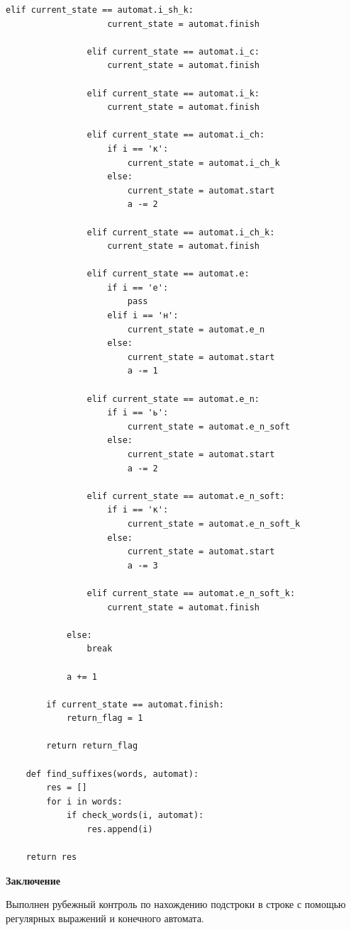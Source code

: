 \documentclass[a4paper,12pt]{report}
\begin{document}
\begin{lstlisting}[frame = single, breaklines, label = list:automat_func, caption = Листинг функций\, работающих с автоматом]
	            elif current_state == automat.i_sh_k:
	                current_state = automat.finish
	
	            elif current_state == automat.i_c:
	                current_state = automat.finish
	
	            elif current_state == automat.i_k:
	                current_state = automat.finish
	
	            elif current_state == automat.i_ch:
	                if i == 'к':
	                    current_state = automat.i_ch_k
	                else:
	                    current_state = automat.start
	                    a -= 2
	
	            elif current_state == automat.i_ch_k:
	                current_state = automat.finish
	
	            elif current_state == automat.e:
	                if i == 'е':
	                    pass
	                elif i == 'н':
	                    current_state = automat.e_n
	                else:
	                    current_state = automat.start
	                    a -= 1
	
	            elif current_state == automat.e_n:
 	                if i == 'ь':
	                    current_state = automat.e_n_soft
	                else:
	                    current_state = automat.start
	                    a -= 2
	
	            elif current_state == automat.e_n_soft:
	                if i == 'к':
	                    current_state = automat.e_n_soft_k
	                else:
	                    current_state = automat.start
	                    a -= 3
	
	            elif current_state == automat.e_n_soft_k:
	                current_state = automat.finish
	
	        else:
	            break

	        a += 1
	
	    if current_state == automat.finish:
	        return_flag = 1
	
	    return return_flag
	
	def find_suffixes(words, automat):
	    res = []
	    for i in words:
	        if check_words(i, automat):
	            res.append(i)
	
	return res
	        \end{lstlisting} 	
    \newpage

    \begin{center}
        \textbf{Заключение}
        \label{sec:conclusion_part}
    \end{center}
        
   		Выполнен рубежный контроль по нахождению подстроки в строке с помощью регулярных выражений и конечного автомата.
\end{document}
